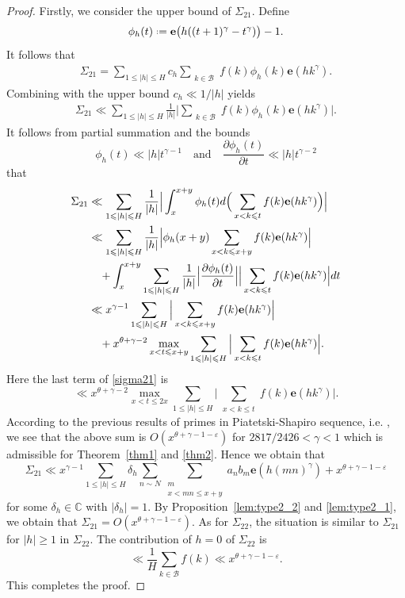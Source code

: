 \documentclass[12pt, reqno, twoside, letterpaper]{amsart}
\numberwithin{equation}{section}
\newcommand{\e}{\ensuremath{\mathbf{e}}}
\newcommand{\cB}{\ensuremath{\mathcal{B}}}
\newcommand{\CC}{\ensuremath{\mathbb{C}}}
\theoremstyle{customthm}
\theoremstyle{customrem}
\newcommand*{\defeq}{\mathrel{\vcenter{\baselineskip0.5ex \lineskiplimit0pt
			\hbox{\scriptsize.}\hbox{\scriptsize.}}}%
	=}
\def\int{\intop\nolimits}
\begin{document}
\begin{proof}
Firstly, we consider the upper bound of $\Sigma_{21}$. Define
$$
\phi_h(t) \defeq \e\big(h((t+1)^{\gamma}-t^{\gamma})\big)-1. 
$$
It follows that
\begin{align*}
\Sigma_{21} = \sum_{1 \leqslant |h| \leqslant H} c_h \sum_{\substack{k \in \cB}} f(k) \phi_h(k) \e(hk^{\gamma}).
\end{align*}
Combining with the upper bound $c_h \ll 1/|h|$ yields
\begin{align*}
\Sigma_{21} \ll \sum_{1 \leqslant |h| \leqslant H} \frac{1}{|h|} \Big| \sum_{\substack{k \in \cB}} f(k) \phi_h(k) \e(hk^{\gamma}) \Big|.
\end{align*}
It follows from partial summation and the bounds
$$
\phi_h(t) \ll |h|t^{\gamma-1} \quad \text{and} \quad \frac{\partial \phi_h(t)}{\partial t} \ll |h|t^{\gamma-2}
$$
that
\begin{align}\label{sigma21}
\nonumber
\Sigma_{21} &\ll \sum_{1 \leqslant |h| \leqslant H} \frac{1}{|h|} \Big| \int_{x}^{x+y} \phi_h(t) d\Big( \sum_{\substack{x < k \leqslant t}} f(k) \e(hk^{\gamma}) \Big) \Big| \\
\nonumber
&\ll \sum_{1 \leqslant |h| \leqslant H} \frac{1}{|h|} \Big| \phi_h(x+y) \sum_{\substack{x < k \leqslant x+y}} f(k) \e(hk^{\gamma})\Big| \\
\nonumber
&\quad + \int_{x}^{x+y} \sum_{1 \leqslant |h| \leqslant H} \frac{1}{|h|} \Big| \frac{\partial \phi_h(t)}{\partial t} \Big| \Big| \sum_{\substack{x < k \leqslant t}} f(k) \e(hk^{\gamma}) \Big|dt \\
\nonumber
&\ll  x^{\gamma-1} \sum_{1 \leqslant |h| \leqslant H} \Big| \sum_{\substack{x < k \leqslant x+y}} f(k) \e(hk^{\gamma}) \Big| \\
&\quad + x^{\theta+\gamma-2} \max_{x < t \leqslant x+y} \sum_{1 \leqslant |h| \leqslant H} \Big| \sum_{\substack{x < k \leqslant t}} f(k) \e(hk^{\gamma}) \Big|.
\end{align}
Here the last term of \eqref{sigma21} is
$$
\ll x^{\theta+\gamma-2} \max_{x < t \leqslant 2x} \sum_{1 \leqslant |h| \leqslant H} \Big| \sum_{\substack{x < k \leqslant t}} f(k) \e(hk^{\gamma}) \Big|.
$$
According to the previous results of primes in Piatetski-Shapiro sequence, i.e. \cite{RiSa}, we see that the above sum is $O(x^{\theta+\gamma-1-\varepsilon})$ for $2817/2426<\gamma<1$ which is admissible for Theorem~\ref{thm1} and \ref{thm2}. Hence we obtain that 
$$
\Sigma_{21} \ll x^{\gamma-1} \sum_{1 \leqslant |h| \leqslant H} \delta_h \sum_{n \sim N}\sum_{\substack{m \\ x < mn \leqslant x+y }} a_n b_m \e(h(mn)^{\gamma}) + x^{\theta+\gamma-1-\varepsilon}
$$
for some $\delta_h \in \CC$ with $|\delta_h|=1$.
By Proposition~\ref{lem:type2_2} and \ref{lem:type2_1}, we obtain that $\Sigma_{21} = O(x^{\theta + \gamma - 1 - \varepsilon})$. As for $\Sigma_{22}$, the situation is similar to $\Sigma_{21}$ for $|h| \geqslant 1$ in $\Sigma_{22}$. The contribution of $h=0$ of $\Sigma_{22}$ is
$$
\ll \frac{1}{H} \sum_{k \in \cB} f(k) \ll x^{\theta + \gamma - 1 - \varepsilon}.
$$
This completes the proof.
\end{proof}
\end{document}
